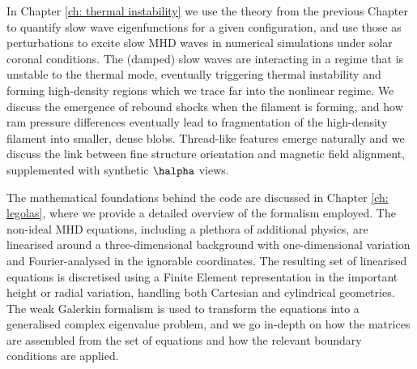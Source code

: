 In Chapter \ref{ch: thermal instability} we use the theory from the previous Chapter to quantify slow wave eigenfunctions for a given configuration, and use those as perturbations to excite slow MHD waves in numerical simulations under solar coronal conditions. The (damped) slow waves are interacting in a regime that is unstable to the thermal mode, eventually triggering thermal instability and forming high-density regions which we trace far into the nonlinear regime. We discuss the emergence of rebound shocks when the filament is forming, and how ram pressure differences eventually lead to fragmentation of the high-density filament into smaller, dense blobs. Thread-like features emerge naturally and we discuss the link between fine structure orientation and magnetic field alignment, supplemented with synthetic {$\halpha$} views.

The mathematical foundations behind the {\legolas} code are discussed in Chapter \ref{ch: legolas}, where we provide a detailed overview of the formalism employed. The non-ideal MHD equations, including a plethora of additional physics, are linearised around a three-dimensional background with one-dimensional variation and Fourier-analysed in the ignorable coordinates. The resulting set of linearised equations is discretised using a Finite Element representation in the important height or radial variation, handling both Cartesian and cylindrical geometries. The weak Galerkin formalism is used to transform the equations into a generalised complex eigenvalue problem, and we go in-depth on how the matrices are assembled from the set of equations and how the relevant boundary conditions are applied.




\cleardoublepage
